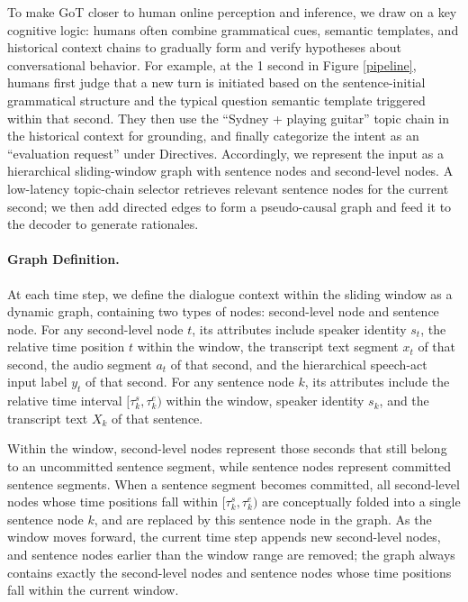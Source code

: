 To make GoT closer to human online perception and inference, we draw on a key cognitive logic: humans often combine grammatical cues, semantic templates, and historical context chains to gradually form and verify hypotheses about conversational behavior. For example, at the 1 second in Figure \ref{pipeline}, humans first judge that a new turn is initiated based on the sentence-initial grammatical structure and the typical question semantic template triggered within that second. They then use the “Sydney + playing guitar” topic chain in the historical context for grounding, and finally categorize the intent as an “evaluation request” under Directives. Accordingly, we represent the input as a hierarchical sliding-window graph with sentence nodes and second-level nodes. A low-latency topic-chain selector retrieves relevant sentence nodes for the current second; we then add directed edges to form a pseudo-causal graph and feed it to the decoder to generate rationales.

\paragraph{Graph Definition.}
At each time step, we define the dialogue context within the sliding window as a dynamic graph, containing two types of nodes: second-level node and sentence node. For any second-level node $t$, its attributes include speaker identity $s_t$, the relative time position $t$ within the window, the transcript text segment $x_t$ of that second, the audio segment $a_t$ of that second, and the hierarchical speech-act input label $y_t$ of that second. For any sentence node $k$, its attributes include the relative time interval $[\tau_k^s,\tau_k^e)$ within the window,  speaker identity $s_k$, and the transcript text $X_k$ of that sentence.

Within the window, second-level nodes represent those seconds that still belong to an uncommitted sentence segment, while sentence nodes represent committed sentence segments. When a sentence segment becomes committed, all second-level nodes whose time positions fall within $[\tau_k^s,\tau_k^e)$ are conceptually folded into a single sentence node $k$, and are replaced by this sentence node in the graph. As the window moves forward, the current time step appends new second-level nodes, and sentence nodes earlier than the window range are removed; the graph always contains exactly the second-level nodes and sentence nodes whose time positions fall within the current window.

